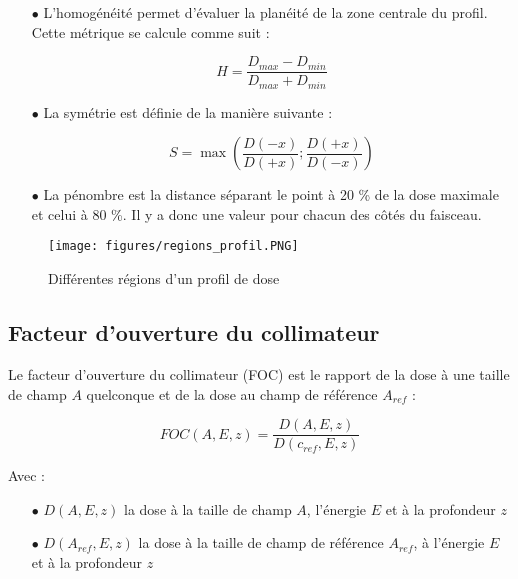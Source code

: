 \documentclass{article}
\begin{document}
\begin{itemize}
  \item[$\bullet$] L'homogénéité permet d'évaluer la planéité de la zone centrale du profil. Cette métrique se calcule comme suit :
  
  \begin{equation}
    H = \dfrac{D_{max} - D_{min}}{D_{max} + D_{min}}
    \label{eq_homogeneite}
  \end{equation}
  
  \item[$\bullet$] La symétrie est définie de la manière suivante :
  
  \begin{equation}
    S = \max\left(\dfrac{D(-x)}{D(+x)}; \dfrac{D(+x)}{D(-x)}\right)
    \label{eq_symetrie}
  \end{equation}
  
  \item[$\bullet$] La pénombre est la distance séparant le point à 20 \% de la dose maximale et celui à 80 \%. Il y a donc une valeur pour chacun des côtés du faisceau.  
\end{itemize}

\begin{figure}[h]
  \centering
  \texttt{[image: figures/regions\_profil.PNG]}
  \caption{Différentes régions d'un profil de dose}
  \label{fig_regions_profil}
\end{figure}

\subsection{Facteur d'ouverture du collimateur}

Le facteur d'ouverture du collimateur (FOC) est le rapport de la dose à une taille de champ $A$ quelconque et de la dose au champ de référence $A_{ref}$ :

\begin{equation}
    FOC(A, E, z) = \dfrac{D(A, E, z)}{D(c_{ref}, E, z)}
    \label{eq_foc}
\end{equation}

Avec :

\begin{itemize}
    \item[$\bullet$] $D(A, E, z)$ la dose à la taille de champ $A$, l'énergie $E$ et à la profondeur $z$
    \item[$\bullet$] $D(A_{ref}, E, z)$ la dose à la taille de champ de référence $A_{ref}$, à l'énergie $E$ et à la profondeur $z$
\end{itemize}
\end{document}

